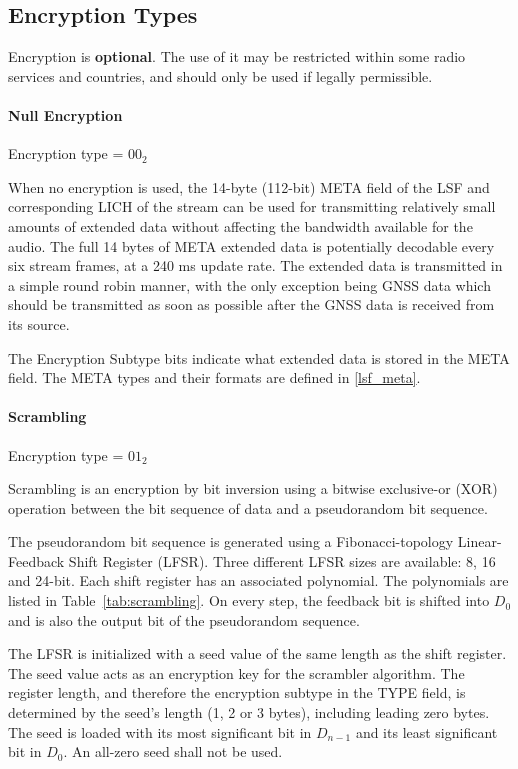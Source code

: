 \documentclass[a4paper,11pt,oneside]{book}
\begin{document}
\subsection{Encryption Types} \label{stream_encryption}

Encryption is \textbf{optional}. The use of it may be restricted within
some radio services and countries, and should only be used if legally
permissible.

\paragraph{Null Encryption}

Encryption type = $00_2$

When no encryption is used, the 14-byte (112-bit) META field of the LSF and corresponding LICH of the stream can be used for transmitting relatively small amounts of extended data without affecting the bandwidth available for the audio. The full 14 bytes of META extended data is potentially decodable every six stream frames, at a 240 ms update rate. The extended data is transmitted in a simple round robin manner, with the only exception being GNSS data which should be transmitted as soon as possible after the GNSS data is received from its source.

The Encryption Subtype bits indicate what extended data is stored in the META field. The META types and their formats are defined in \autoref{lsf_meta}.

\paragraph{Scrambling}

Encryption type = $01_2$

Scrambling is an encryption by bit inversion using a bitwise exclusive-or (XOR) operation between the bit sequence of data and a pseudorandom bit sequence.

The pseudorandom bit sequence is generated using a Fibonacci-topology Linear-Feedback Shift Register (LFSR). Three different LFSR sizes are available: 8, 16 and 24-bit. Each shift register has an associated polynomial. The polynomials are listed in Table~\ref{tab:scrambling}. On every step, the feedback bit is shifted into $D_0$ and is also the output bit of the pseudorandom sequence.

The LFSR is initialized with a seed value of the same length as the shift register. The seed value acts as an encryption key for the scrambler algorithm. The register length, and therefore the encryption subtype in the TYPE field, is determined by the seed's length (1, 2 or 3 bytes), including leading zero bytes. The seed is loaded with its most significant bit in $D_{n-1}$ and its least significant bit in $D_0$. An all-zero seed shall not be used.
\end{document}
